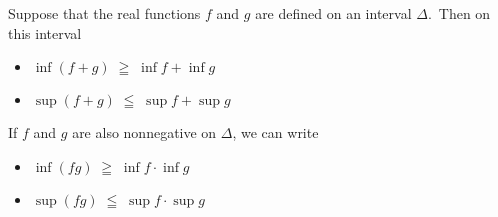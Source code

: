 \documentclass[12pt]{article}
\theoremstyle{definition}
\begin{document}
Suppose that the real functions $f$ and $g$ are defined on an interval $\Delta$.\, Then on this interval
\begin{itemize}
\item $\inf(f\!+\!g) \;\geqq\; \inf f+\inf g$
\item $\sup(f\!+\!g) \;\leqq\; \sup f+\sup g$
\end{itemize}

If $f$ and $g$ are also nonnegative on $\Delta$, we can write
\begin{itemize}
\item $\inf(fg) \;\geqq\; \inf f\cdot\inf g$
\item $\sup(fg) \;\leqq\; \sup f\cdot\sup g$
\end{itemize}


\end{document}
